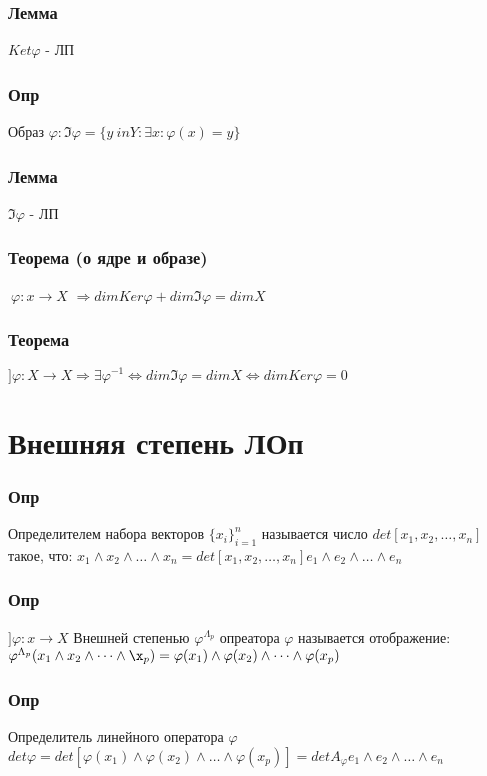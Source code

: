 \documentclass{article}
\begin{document}
\subsubsection{Лемма}
$Ket \varphi$ - ЛП

\subsubsection{Опр}
Образ $\varphi : \Im \varphi = \{y \ in Y : \exists x : \varphi(x) = y\}$

\subsubsection{Лемма}
$\Im \varphi$ - ЛП

\subsubsection{Теорема (о ядре и образе)}
$\ \varphi : x \rightarrow X$
$\Rightarrow dim Ker \varphi + dim \Im \varphi = dim X$


\subsubsection{Теорема}
$] \varphi : X \rightarrow X \Rightarrow \exists \varphi^{-1} \Leftrightarrow
dim \Im \varphi = dim X \Leftrightarrow dim Ker \varphi = 0$

\section{Внешняя степень ЛОп}

\subsubsection{Опр}
Определителем набора векторов $\{x_i\}_{i=1}^n$  называется число $det[x_1, x_2,
\dots, x_n]$ такое, что: $x_1 \wedge x_2 \wedge \dots \wedge x_n = det[x_1, x_2,
\dots, x_n]e_1 \wedge e_2 \wedge \dots \wedge e_n$

\subsubsection{Опр}
$] \varphi : x \rightarrow X$
Внешней степенью $\varphi^{\Lambda_p}$ опреатора $\varphi$ называется
отображение:
$\varphi^{\Lambda_p}(x_1 \wedge x_2 \wedge \dots \wedge \x_p) = \varphi(x_1)
\wedge \varphi(x_2) \wedge \dots \wedge \varphi({x_p})$

\subsubsection{Опр}
Определитель линейного оператора $\varphi$ \\
$det \varphi = det[\varphi(x_1) \wedge \varphi(x_2) \wedge \dots \wedge
\varphi({x_p})] = det A_\varphi e_1 \wedge e_2 \wedge \dots \wedge e_n$
\end{document}
